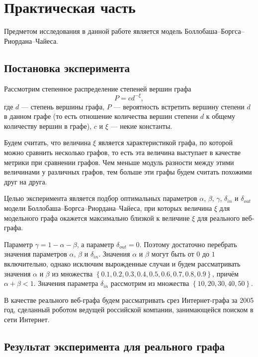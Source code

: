\documentclass[14pt]{extreport}
\begin{document}
\chapter{Практическая часть}

Предметом исследования в данной работе является модель Боллобаша--Боргса--Риордана--Чайеса.

\section{Постановка эксперимента}

Рассмотрим степенное распределение степеней вершин графа
$$
P = c d^{-\xi},
$$
где $d$ --- степень вершины графа, $P$ --- вероятность встретить вершину степени $d$ в данном графе (то есть отношение количества вершин степени $d$ к общему количеству вершин в графе), $c$ и $\xi$ --- некие константы.

Будем считать, что величина $\xi$ является характеристикой графа, по которой можно сравнить несколько графов, то есть эта величина выступает в качестве метрики при сравнении графов. Чем меньше модуль разности между этими величинами у различных графов, тем больше эти графы будем считать похожими друг на друга.

Целью эксперимента является подбор оптимальных параметров $\alpha$, $\beta$, $\gamma$, $\delta_{in}$ и $\delta_{out}$ модели Боллобаша--Боргса--Риордана--Чайеса, при которых величина $\xi$ для модельного графа окажется максимально близкой к величине $\xi$ для реального веб-графа.

Параметр $\gamma = 1 - \alpha - \beta$, а параметр $\delta_{out} = 0$. Поэтому достаточно перебрать значения параметров $\alpha$, $\beta$ и $\delta_{in}$. Значения $\alpha$ и $\beta$ могут быть от $0$ до $1$ включительно, однако исключим вырожденные случаи и будем рассматривать значения $\alpha$ и $\beta$ из множества $\left\{0.1, 0.2, 0.3, 0.4, 0.5, 0.6, 0.7, 0.8, 0.9\right\}$, причём $\alpha + \beta < 1$. Значения параметра $\delta_{in}$ рассмотрим из множества $\left\{10, 20, 30, 40, 50\right\}$.

В качестве реального веб-графа будем рассматривать срез Интернет-графа за 2005 год, сделанный роботом ведущей российской компании, занимающейся поиском в сети Интернет.

\section{Результат эксперимента для реального графа}
\end{document}
